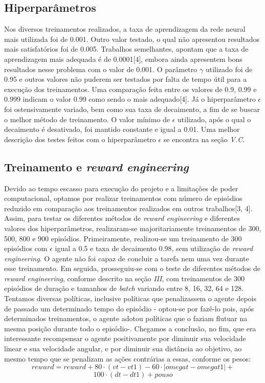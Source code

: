 \documentclass[letterpaper, 10 pt, conference]{ieeeconf}  %
\begin{document}
\subsection{Hiperparâmetros}
Nos diversos treinamentos realizados, a taxa de aprendizagem da rede neural mais utilizada foi de 0.001. Outro valor testado, o qual não apresentou resultados mais satisfatórios foi de 0.005. Trabalhos semelhantes, apontam que a taxa de aprendizagem mais adequada é de 0.0001[4], embora ainda apresentem bons resultados nesse problema com o valor de 0.001. O parâmetro \(\gamma\) utilizado foi de 0.95 e outros valores não puderem ser testados por falta de tempo útil para a execução dos treinamentos. Uma comparação feita entre os valores de 0.9, 0.99 e 0.999 indicam o valor 0.99 como sendo o mais adequado[4]. Já o hiperparâmetro \(\epsilon\) foi ostensivamente variado, bem como sua taxa de decaimento, a fim de se buscar o melhor método de treinamento.
O valor mínimo de \(\epsilon\) utilizado, após o qual o decaimento é desativado, foi mantido constante e igual a 0.01. Uma melhor descrição dos testes feitos com o hiperparâmetro \(\epsilon\) se encontra na seção \emph{V.C}.

\subsection{Treinamento e \emph{reward engineering}}
Devido ao tempo escasso para execução do projeto e a limitações de poder computacional, optamos por realizar treinamentos com número de episódios reduzido em comparação aos treinamentos realizados em outros trabalhos[3, 4]. Assim, para testar os diferentes métodos de \emph{reward engineering} e diferentes valores dos hiperparâmetros, realizaram-se majoritariamente treinamentos de 300, 500, 800 e 900 episódios.  
Primeiramente, realizou-se um treinamento de 300 episódios com \(\epsilon\) igual a 0.5 e taxa de decaimento 0.98, sem utilização de \emph{reward engineering}. O agente não foi capaz de concluir a tarefa nem uma vez durante esse treinamento. 
Em seguida, prosseguiu-se com o teste de diferentes métodos de \emph{reward engineering}, conforme descrito na seção \emph{III}, com treinamentos de 300 episódios de duração e tamanhos de \emph{batch} variando entre 8, 16, 32, 64 e 128. Tentamos diversas políticas, inclusive políticas que penalizassem o agente depois de passado um determinado tempo do episódio - optou-se por fazê-lo pois, após determinados treinamentos, o agente adotou políticas que o faziam flutuar na mesma posição durante todo o episódio-. Chegamos a conclusão, no fim, que era interessante recompensar o agente positivamente por diminuir sua velocidade linear e sua velocidade angular, e por diminuir sua distância ao objetivo, ao mesmo tempo que se penalizam as ações contrárias a essas, conforme os pesos:
$$reward = reward + 80\cdot(vt-vt1) - 60\cdot|omegat-omegat1| + $$ $$100\cdot(dt-dt1) + pouso$$
\end{document}
